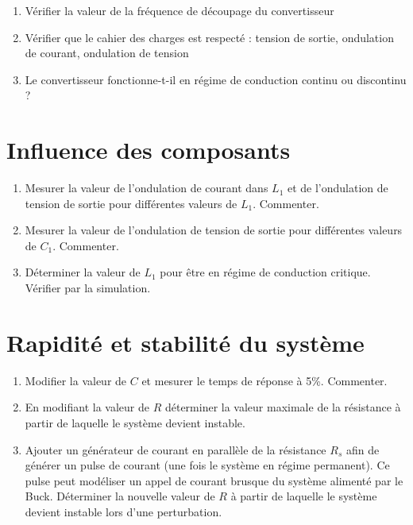 \begin{enumerate}
\item Vérifier la valeur de la fréquence de découpage du convertisseur
\item Vérifier que le cahier des charges est respecté : tension de sortie, ondulation de courant, ondulation de tension
\item Le convertisseur fonctionne-t-il en régime de conduction continu ou discontinu ?
\end{enumerate}


\section{Influence des composants}

\begin{enumerate}
    \item Mesurer la valeur de l'ondulation de courant dans $L_1$ et de l'ondulation de tension de sortie pour différentes valeurs de $L_1$. Commenter.
    \item Mesurer la valeur de l'ondulation de tension de sortie pour différentes valeurs de $C_1$. Commenter.
    \item Déterminer la valeur de $L_1$ pour être en régime de conduction critique. Vérifier par la simulation.
\end{enumerate}

\section{Rapidité et stabilité du système}

\begin{enumerate}
    \item Modifier la valeur de $C$ et mesurer le temps de réponse à 5\%. Commenter.
    \item En modifiant la valeur de $R$ déterminer la valeur maximale de la résistance à partir de laquelle le système devient instable.
    \item Ajouter un générateur de courant en parallèle de la résistance $R_s$ afin de générer un pulse de courant (une fois le système en régime permanent). 
    Ce pulse peut modéliser un appel de courant brusque du système alimenté par le Buck. Déterminer la nouvelle valeur de $R$ à partir de laquelle le système devient instable lors d'une perturbation.
\end{enumerate}